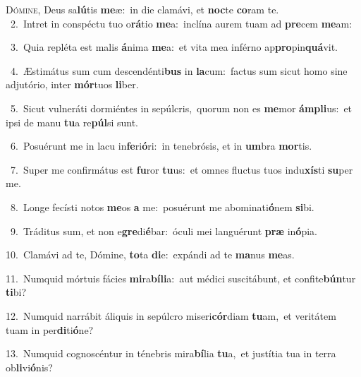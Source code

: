 \lettrine{\initial\textcolor{\initialcolor}{D}}{ómine,} Deus sa\-\textbf{lú}\-tis \textbf{me}\-æ:~\star in die clamávi, et \textbf{noc}\-te \textbf{co}\-ram te.\\
{\numbfont\textcolor{\numbcolor}{~2.}}~Intret in conspéctu tuo o\-\textbf{rá}\-tio \textbf{me}\-a:~\star inclína aurem tuam ad \textbf{pre}\-cem \textbf{me}\-am:\par
{\numbfont\textcolor{\numbcolor}{~3.}}~Quia repléta est malis \textbf{á}\-nima \textbf{me}\-a:~\star et vita mea inférno ap\-\textbf{pro}\-pin\-\textbf{quá}\-vit.\par
{\numbfont\textcolor{\numbcolor}{~4.}}~Æstimátus sum cum descendénti\textbf{bus} in \textbf{la}\-cum:~\star factus sum sicut homo sine adjutório, inter \textbf{mór}\-tuos \textbf{li}\-ber.\par
{\numbfont\textcolor{\numbcolor}{~5.}}~Sicut vulneráti dormiéntes in sepúlcris,~\dagger quorum non es \textbf{me}\-mor \textbf{ám}\-\textbf{pli}us:~\star et ipsi de manu \textbf{tu}\-a re\-\textbf{púl}\-si sunt.\par
{\numbfont\textcolor{\numbcolor}{~6.}}~Posuérunt me in lacu in\-\textbf{fe}\-ri\-\textbf{ó}\-ri:~\star in tenebrósis, et in \textbf{um}\-bra \textbf{mor}\-tis.\par
{\numbfont\textcolor{\numbcolor}{~7.}}~Super me confirmátus est \textbf{fu}\-ror \textbf{tu}\-us:~\star et omnes fluctus tuos indu\-\textbf{xís}\-ti \textbf{su}\-per me.\par
{\numbfont\textcolor{\numbcolor}{~8.}}~Longe fecísti notos \textbf{me}\-os \textbf{a} me:~\star posuérunt me abominati\-\textbf{ó}\-nem \textbf{si}\-bi.\par
{\numbfont\textcolor{\numbcolor}{~9.}}~Tráditus sum, et non e\-\textbf{gre}\-di\-\textbf{é}\-bar:~\star óculi mei languérunt \textbf{præ} in\-\textbf{ó}\-pia.\par
{\numbfont\textcolor{\numbcolor}{10.}}~Clamávi ad te, Dómine, \textbf{to}\-ta \textbf{di}\-e:~\star expándi ad te \textbf{ma}\-nus \textbf{me}\-as.\par
{\numbfont\textcolor{\numbcolor}{11.}}~Numquid mórtuis fácies \textbf{mi}\-ra\-\textbf{bí}\-\textbf{li}a:~\star aut médici suscitábunt, et confite\-\textbf{bún}\-tur \textbf{ti}\-bi?\par
{\numbfont\textcolor{\numbcolor}{12.}}~Numquid narrábit áliquis in sepúlcro miseri\-\textbf{cór}\-diam \textbf{tu}\-am,~\star et veritátem tuam in per\-\textbf{di}\-ti\-\textbf{ó}\-ne?\par
{\numbfont\textcolor{\numbcolor}{13.}}~Numquid cognoscéntur in ténebris mira\-\textbf{bí}\-lia \textbf{tu}\-a,~\star et justítia tua in terra ob\-\textbf{li}\-vi\-\textbf{ó}\-nis?\par
